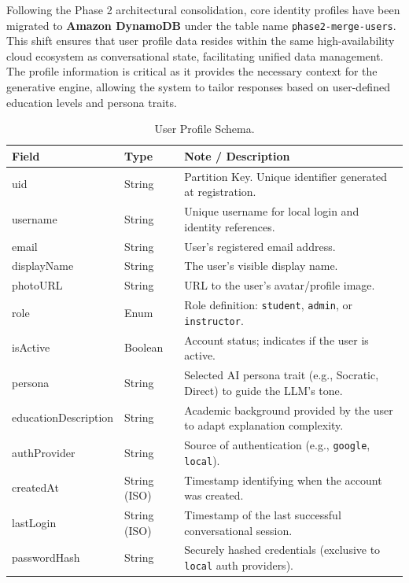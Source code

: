 Following the Phase 2 architectural consolidation, core identity profiles have been migrated to \textbf{Amazon DynamoDB} under the table name \texttt{phase2-merge-users}. This shift ensures that user profile data resides within the same high-availability cloud ecosystem as conversational state, facilitating unified data management. The profile information is critical as it provides the necessary context for the generative engine, allowing the system to tailor responses based on user-defined education levels and persona traits.

\begin{table}[H]
    \centering
    \caption{User Profile Schema.}
    \label{tab:user_profiles}
    \begin{tabular}{llp{8cm}}
        \toprule
        \textbf{Field} & \textbf{Type} & \textbf{Note / Description} \\
        \midrule
        uid & String & Partition Key. Unique identifier generated at registration. \\
        \midrule
        username & String & Unique username for local login and identity references. \\
        email & String & User's registered email address. \\
        displayName & String & The user's visible display name. \\
        photoURL & String & URL to the user's avatar/profile image. \\
        role & Enum & Role definition: \texttt{student}, \texttt{admin}, or \texttt{instructor}. \\
        isActive & Boolean & Account status; indicates if the user is active. \\
        persona & String & Selected AI persona trait (e.g., Socratic, Direct) to guide the LLM's tone. \\
        educationDescription & String & Academic background provided by the user to adapt explanation complexity. \\
        authProvider & String & Source of authentication (e.g., \texttt{google}, \texttt{local}). \\
        createdAt & String (ISO) & Timestamp identifying when the account was created. \\
        lastLogin & String (ISO) & Timestamp of the last successful conversational session. \\
        passwordHash & String & Securely hashed credentials (exclusive to \texttt{local} auth providers). \\
        \bottomrule
    \end{tabular}
\end{table}

